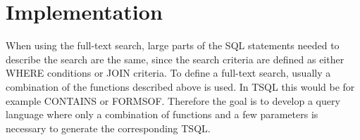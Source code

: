 \newpage
\section{Implementation}
When using the full-text search, large parts of the \ac{SQL} statements needed to describe the search are the same, since the search criteria are defined as either WHERE conditions or JOIN criteria. To define a full-text search, usually a combination of the functions described above is used. In \ac{TSQL} this would be for example CONTAINS or FORMSOF. Therefore the goal is to develop a query language where only a combination of functions and a few parameters is necessary to generate the corresponding \ac{TSQL}.